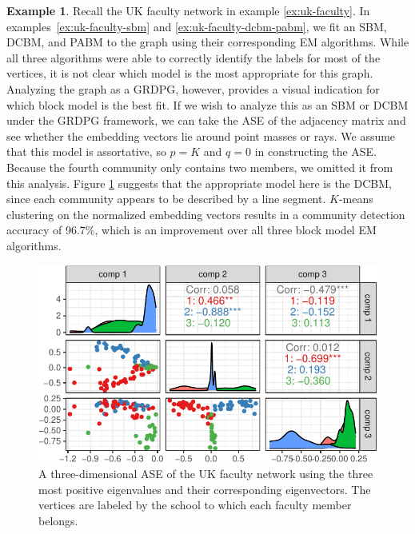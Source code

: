 \documentclass[
  12pt,
]{article}
\theoremstyle{definition}
\theoremstyle{definition}
\newtheorem{example}{Example}[section]
\theoremstyle{definition}
\theoremstyle{definition}
\theoremstyle{remark}
\begin{document}
\begin{example}
Recall the UK faculty network in example \ref{ex:uk-faculty}. 
In examples~\ref{ex:uk-faculty-sbm} and \ref{ex:uk-faculty-dcbm-pabm}, we fit an SBM, DCBM, and PABM to the graph using their corresponding EM algorithms. 
While all three algorithms were able to correctly identify the labels for most of the vertices, it is not clear which model is the most appropriate for this graph. 
Analyzing the graph as a GRDPG, however, provides a visual indication for which block model is the best fit. 
If we wish to analyze this as an SBM or DCBM under the GRDPG framework, we can take the ASE of the adjacency matrix and see whether the embedding vectors lie around point masses or rays. 
We assume that this model is assortative, so $p = K$ and $q = 0$ in constructing the ASE. 
Because the fourth community only contains two members, we omitted it from this analysis. 
Figure \ref{fig:ukfaculty-ase} suggests that the appropriate model here is the DCBM, since each community appears to be described by a line segment. 
$K$-means clustering on the normalized embedding vectors results in a community detection accuracy of 96.7\%, which is an improvement over all three block model EM algorithms. 

\begin{figure}[H]

{\centering \includegraphics{draft_files/figure-latex/ukfaculty-ase-1} 

}

\caption{A three-dimensional ASE of the UK faculty network using the three most positive eigenvalues and their corresponding eigenvectors. The vertices are labeled by the school to which each faculty member belongs.}\label{fig:ukfaculty-ase}
\end{figure}

\end{example}
\end{document}
